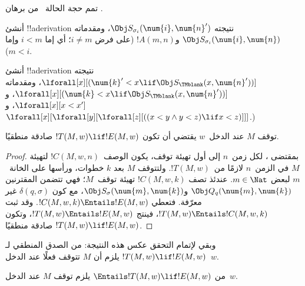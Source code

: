 \documentclass[../../../include/open-logic-section]{subfiles}
\begin{document}
\begin{prob}
تمم حجة الحالة~ من برهان
.
\end{prob}

\begin{prob}
أنشئ !!a{derivation} نتيجته $\Obj S_{\sigma_i}(\num{i},\num{n}')$، ومقدماته
$\Obj S_{\sigma_i}(\num{i},\num{n})$ و$!A(m,n)$ (على فرض
$i\neq m$؛ أي إما $i<m$ وإما $m<i$).
\end{prob}

\begin{prob}
أنشئ !!a{derivation} نتيجته
$\lforall[x][(\num{k}'<x\lif\Obj S_\TMblank(x,\num{n}'))]$، ومقدماته
$\lforall[x][(\num{k}<x\lif\Obj S_\TMblank(x,\num{n}'))]$، و
$\lforall[x][x<x']$، و
$\lforall[x][\lforall[y][\lforall[z][((x<y\land y<z)\lif x<z)]]]$.)
\end{prob}

\begin{lem}
توقف $M$ عند الدخل~$w$ يقتضي أن تكون $!T(M,w)\lif !E(M,w)$ صادقة
منطقيًا.
\end{lem}

\begin{proof}
بمقتضى ، لكل زمن~$n$ إلى أول تهيئة توقف،
يكون الوصف~$!C(M,w,n)$ لتهيئة $M$ في الزمن~$n$ لازمًا
من~$!T(M,w)$. ولتتوقف $M$ بعد $k$ خطوات، ورأسها على
الخانة~$m$ لبعض $m\in\Nat$. عندئذ تصف $!C(M,w,k)$ تهيئة
توقف~$M$؛ فهي تتضمن المقترنين
$\Obj Q_q(\num{m},\num{k})$ و$\Obj S_\sigma(\num{m},\num{k})$،
مع كون $\delta(q,\sigma)$ غير معرّفة. فتعطي
$!C(M,w,k)\Entails !E(M,w)$. وقد ثبت
$!T(M,w)\Entails !C(M,w,k)$، فينتج
$!T(M,w)\Entails !E(M,w)$، وتكون
$!T(M,w)\lif !E(M,w)$ صادقة منطقيًا.
\end{proof}

\begin{explain}
وبقي لإتمام التحقق عكس هذه النتيجة: من الصدق المنطقي لـ
$!T(M,w)\lif !E(M,w)$ يلزم أن $M$ تتوقف فعلًا عند
الدخل~$w$.
\end{explain}

\begin{lem}
من $\Entails !T(M,w)\lif !E(M,w)$ يلزم توقف $M$ عند
الدخل~$w$.
\end{lem}
\end{document}

